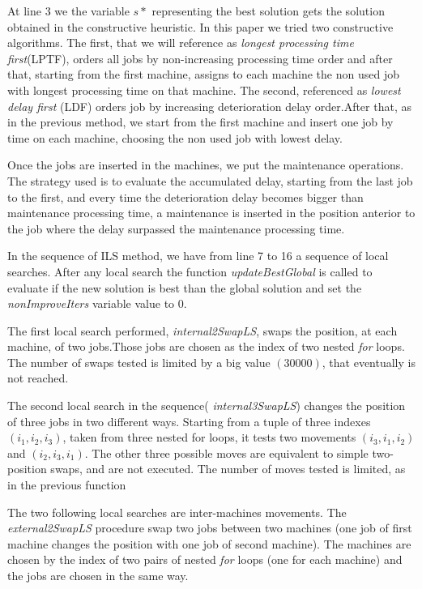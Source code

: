 \documentclass[a4paper,11pt]{article}
\begin{document}
At line 3 we the variable $s*$ representing the best solution gets the solution obtained in the constructive heuristic. In this paper we tried two constructive algorithms. The first, that we will reference as \emph{ longest processing time first}(LPTF), orders all jobs by non-increasing processing time order and after that, starting from the first machine, assigns to each machine the non used job with longest processing time on that machine. The second, referenced as \emph{lowest delay first} (LDF) orders job by increasing deterioration delay order.After that, as in the previous method, we start from the first machine and insert one job by time on each machine, choosing the non used job with lowest delay. 

Once the jobs are inserted in the machines, we put the maintenance operations. The strategy used is to evaluate the accumulated delay, starting from the last job to the first, and every time the deterioration delay becomes bigger than maintenance processing time, a maintenance is inserted in the position anterior to the job where the delay surpassed the maintenance processing time. 

In the sequence of ILS method, we have from line 7 to 16 a sequence of local searches. After any local search the function \emph{updateBestGlobal} is called to evaluate if the new solution is best than the global solution and set the \emph{nonImproveIters} variable value to 0.

The first local search performed, \emph{internal2SwapLS}, swaps the position, at each machine, of two jobs.Those jobs are chosen as the index of two nested \emph{for} loops. The number of swaps tested is limited by a big value $(30000)$, that eventually is not reached. 

The second local search in the sequence( \emph{internal3SwapLS}) changes the position of three jobs in two different ways. Starting from a tuple of three indexes $(i_1, i_2, i_3)$, taken from three nested for loops, it tests two movements $(i_3, i_1, i_2)$ and $(i_2, i_3,i_1)$. The other three possible moves are equivalent to simple two-position swaps, and are not executed. The number of moves tested is limited, as in the previous function

The two following local searches are inter-machines movements. The \emph{external2SwapLS} procedure swap two jobs between two machines (one job of first machine changes the position with one job of second machine). The machines are chosen by the index of two pairs of nested \emph{for} loops (one for each machine) and the jobs are chosen in the same way. 
\end{document}
